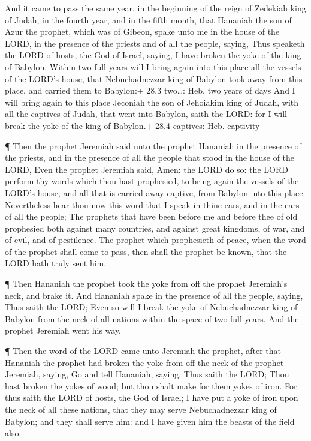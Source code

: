  And it came to pass the same year, in the beginning of the
reign of Zedekiah king of Judah, in the fourth year, and in the fifth
month, that Hananiah the son of Azur the prophet, which was of Gibeon,
spake unto me in the house of the LORD, in the presence of the priests
and of all the people, saying,  Thus speaketh the LORD of
hosts, the God of Israel, saying, I have broken the yoke of the king of
Babylon.  Within two full years will I bring again into this
place all the vessels of the LORD's house, that Nebuchadnezzar king of
Babylon took away from this place, and carried them to Babylon:+ 28.3
two\ldots: Heb. two years of days  And I will bring again to
this place Jeconiah the son of Jehoiakim king of Judah, with all the
captives of Judah, that went into Babylon, saith the LORD: for I will
break the yoke of the king of Babylon.+ 28.4 captives: Heb. captivity

 ¶ Then the prophet Jeremiah said unto the prophet Hananiah
in the presence of the priests, and in the presence of all the people
that stood in the house of the LORD,  Even the prophet
Jeremiah said, Amen: the LORD do so: the LORD perform thy words which
thou hast prophesied, to bring again the vessels of the LORD's house,
and all that is carried away captive, from Babylon into this place.
 Nevertheless hear thou now this word that I speak in thine
ears, and in the ears of all the people;  The prophets that
have been before me and before thee of old prophesied both against many
countries, and against great kingdoms, of war, and of evil, and of
pestilence.  The prophet which prophesieth of peace, when
the word of the prophet shall come to pass, then shall the prophet be
known, that the LORD hath truly sent him.

 ¶ Then Hananiah the prophet took the yoke from off the
prophet Jeremiah's neck, and brake it.  And Hananiah spake
in the presence of all the people, saying, Thus saith the LORD; Even so
will I break the yoke of Nebuchadnezzar king of Babylon from the neck of
all nations within the space of two full years. And the prophet Jeremiah
went his way.

 ¶ Then the word of the LORD came unto Jeremiah the
prophet, after that Hananiah the prophet had broken the yoke from off
the neck of the prophet Jeremiah, saying,  Go and tell
Hananiah, saying, Thus saith the LORD; Thou hast broken the yokes of
wood; but thou shalt make for them yokes of iron.  For thus
saith the LORD of hosts, the God of Israel; I have put a yoke of iron
upon the neck of all these nations, that they may serve Nebuchadnezzar
king of Babylon; and they shall serve him: and I have given him the
beasts of the field also.

